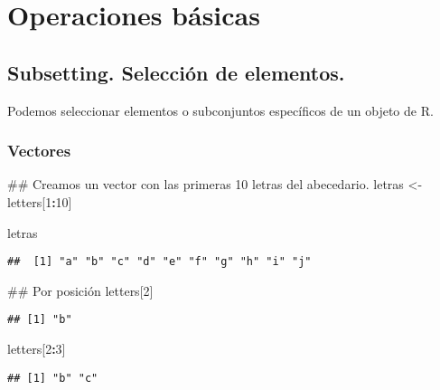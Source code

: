 \documentclass[spanish,]{book}
\newenvironment{Shaded}{\begin{snugshade}}{\end{snugshade}}
\newcommand{\DecValTok}[1]{\textcolor[rgb]{0.00,0.00,0.81}{#1}}
\newcommand{\StringTok}[1]{\textcolor[rgb]{0.31,0.60,0.02}{#1}}
\newcommand{\OperatorTok}[1]{\textcolor[rgb]{0.81,0.36,0.00}{\textbf{#1}}}
\newcommand{\NormalTok}[1]{#1}
\begin{document}
\chapter{Operaciones básicas}\label{operaciones-basicas}

\section{Subsetting. Selección de
elementos.}\label{subsetting.-seleccion-de-elementos.}

Podemos seleccionar elementos o subconjuntos específicos de un objeto de
R.

\subsection{Vectores}\label{vectores-1}

\begin{Shaded}
\begin{Highlighting}[]
\NormalTok{## Creamos un vector con las primeras 10 letras del abecedario.}
\NormalTok{letras <-}\StringTok{ }\NormalTok{letters[}\DecValTok{1}\OperatorTok{:}\DecValTok{10}\NormalTok{]}

\NormalTok{letras}
\end{Highlighting}
\end{Shaded}

\begin{verbatim}
##  [1] "a" "b" "c" "d" "e" "f" "g" "h" "i" "j"
\end{verbatim}

\begin{Shaded}
\begin{Highlighting}[]
\NormalTok{## Por posición}
\NormalTok{letters[}\DecValTok{2}\NormalTok{]}
\end{Highlighting}
\end{Shaded}

\begin{verbatim}
## [1] "b"
\end{verbatim}

\begin{Shaded}
\begin{Highlighting}[]
\NormalTok{letters[}\DecValTok{2}\OperatorTok{:}\DecValTok{3}\NormalTok{]}
\end{Highlighting}
\end{Shaded}

\begin{verbatim}
## [1] "b" "c"
\end{verbatim}
\end{document}
